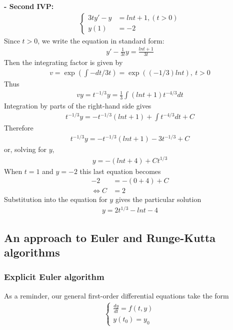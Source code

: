 \documentclass[a4paper]{article}
\numberwithin{equation}{section}
\begin{document}
\textbf{- Second IVP:}
\begin{align*}
  \begin{cases}
    3ty' - y & = lnt + 1, (t > 0) \\
    y(1)     & = -2
  \end{cases}
\end{align*}
Since \( t > 0 \), we write the equation in standard form:
\begin{align*}
  y' - \frac{1}{3t}y = \frac{lnt + 1}{3t}
\end{align*}
Then the integrating factor is given by
\begin{align*}
  v = \exp \left(\int -dt/3t\right) = \exp((-1/3)lnt),\ t > 0
\end{align*}
Thus
\begin{align*}
  vy = t^{-1/3} y = \frac{1}{3} \int(lnt + 1) t^{-4/3} dt
\end{align*}
Integration by parts of the right-hand side gives
\begin{align*}
  t^{-1/3}y = -t^{-1/3}(lnt+1) + \int t^{-4/3}dt + C
\end{align*}
Therefore
\begin{align*}
  t^{-1/3}y = -t^{-1/3}(lnt+1) - 3t^{-1/3} + C
\end{align*}
or, solving for \( y \),
\begin{align*}
  y = -(lnt + 4) + Ct^{1/3}
\end{align*}
When \( t = 1 \) and \( y = -2 \) this last equation becomes
\begin{align*}
  -2                & = -(0+4) + C \\
  \Leftrightarrow C & = 2
\end{align*}
Substitution into the equation for \( y \) gives the particular solution
\begin{align*}
  y = 2t^{1/3} - lnt - 4
\end{align*}

\subsection{An approach to Euler and Runge-Kutta algorithms}
\subsubsection{Explicit Euler algorithm}\label{sssec:explicit_euler}
As a reminder, our general first-order differential equations take the form
\begin{align*}
  \begin{cases}
    \frac{dy}{dt} = f(t,y) \\
    y(t_0) = y_0
  \end{cases}
\end{align*}
\end{document}
